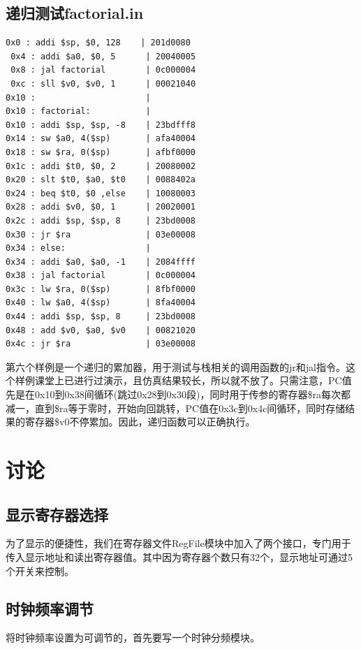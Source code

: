 \documentclass[twocolumn]{article} %
\begin{document}
\begin{sloppypar}
\subsection{{\color{red} 递归测试factorial.in}}

\begin{lstlisting}[]  
 0x0 : addi $sp, $0, 128    | 201d0080
 0x4 : addi $a0, $0, 5      | 20040005
 0x8 : jal factorial        | 0c000004
 0xc : sll $v0, $v0, 1      | 00021040
0x10 :                      | 
0x10 : factorial:           | 
0x10 : addi $sp, $sp, -8    | 23bdfff8
0x14 : sw $a0, 4($sp)       | afa40004
0x18 : sw $ra, 0($sp)       | afbf0000
0x1c : addi $t0, $0, 2      | 20080002
0x20 : slt $t0, $a0, $t0    | 0088402a
0x24 : beq $t0, $0 ,else    | 10080003
0x28 : addi $v0, $0, 1      | 20020001
0x2c : addi $sp, $sp, 8     | 23bd0008
0x30 : jr $ra               | 03e00008
0x34 : else:                | 
0x34 : addi $a0, $a0, -1    | 2084ffff
0x38 : jal factorial        | 0c000004
0x3c : lw $ra, 0($sp)       | 8fbf0000
0x40 : lw $a0, 4($sp)       | 8fa40004
0x44 : addi $sp, $sp, 8     | 23bd0008
0x48 : add $v0, $a0, $v0    | 00821020
0x4c : jr $ra               | 03e00008
\end{lstlisting}  

第六个样例是一个递归的累加器，用于测试与栈相关的调用函数的jr和jal指令。这个样例课堂上已进行过演示，且仿真结果较长，所以就不放了。只需注意，PC值先是在0x10到0x38间循环(跳过0x28到0x30段)，同时用于传参的寄存器\$ra每次都减一，直到\$ra等于零时，开始向回跳转，PC值在0x3c到0x4c间循环，同时存储结果的寄存器\$v0不停累加。因此，递归函数可以正确执行。

\section{讨论}

\subsection{显示寄存器选择}

为了显示的便捷性，我们在寄存器文件RegFile模块中加入了两个接口，专门用于传入显示地址和读出寄存器值。其中因为寄存器个数只有32个，显示地址可通过5个开关来控制。

\subsection{时钟频率调节}

将时钟频率设置为可调节的，首先要写一个时钟分频模块。


\end{sloppypar}
\end{document}
